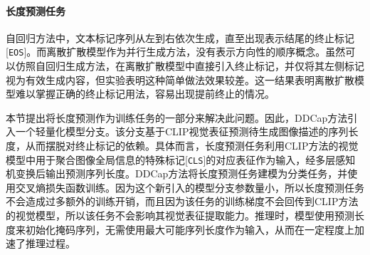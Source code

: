 \paragraph{长度预测任务} 自回归方法中，文本标记序列从左到右依次生成，直至出现表示结尾的终止标记[\texttt{EOS}]。而离散扩散模型作为并行生成方法，没有表示方向性的顺序概念。虽然可以仿照自回归生成方法，在离散扩散模型中直接引入终止标记，并仅将其左侧标记视为有效生成内容，但实验表明这种简单做法效果较差。这一结果表明离散扩散模型难以掌握正确的终止标记用法，容易出现提前终止的情况。

本节提出将长度预测作为训练任务的一部分来解决此问题。因此，DDCap方法引入一个轻量化模型分支。该分支基于CLIP视觉表征预测待生成图像描述的序列长度，从而摆脱对终止标记的依赖。具体而言，长度预测任务利用CLIP方法的视觉模型中用于聚合图像全局信息的特殊标记[\texttt{CLS}]的对应表征作为输入，经多层感知机变换后输出预测序列长度。DDCap方法将长度预测任务建模为分类任务，并使用交叉熵损失函数训练。因为这个新引入的模型分支参数量小，所以长度预测任务不会造成过多额外的训练开销，而且因为该任务的训练梯度不会回传到CLIP方法的视觉模型，所以该任务不会影响其视觉表征提取能力。推理时，模型使用预测长度来初始化掩码序列，无需使用最大可能序列长度作为输入，从而在一定程度上加速了推理过程。


